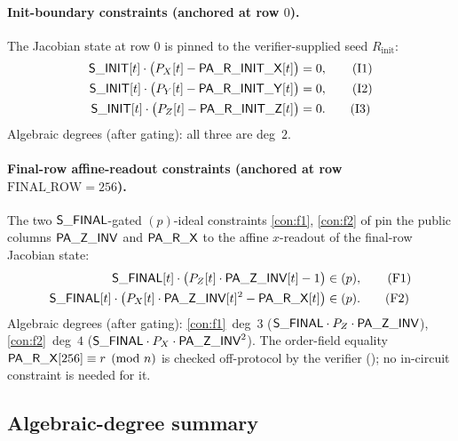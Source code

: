 \paragraph{Init-boundary constraints (anchored at row $0$).}

The Jacobian state at row $0$ is pinned to the verifier-supplied
seed $R_{\mathrm{init}}$:
\begin{align}
\mathsf{S\_INIT}[t] \cdot \bigl(P_X[t] - \mathsf{PA\_R\_INIT\_X}[t]\bigr) &= 0,\tag{I1}\label{con:init-x}\\
\mathsf{S\_INIT}[t] \cdot \bigl(P_Y[t] - \mathsf{PA\_R\_INIT\_Y}[t]\bigr) &= 0,\tag{I2}\label{con:init-y}\\
\mathsf{S\_INIT}[t] \cdot \bigl(P_Z[t] - \mathsf{PA\_R\_INIT\_Z}[t]\bigr) &= 0.\tag{I3}\label{con:init-z}
\end{align}
Algebraic degrees (after gating): all three are deg~$2$.

\paragraph{Final-row affine-readout constraints (anchored at row $\mathrm{FINAL\_ROW} = 256$).}

The two $\mathsf{S\_FINAL}$-gated $(p)$-ideal constraints
\ref{con:f1}, \ref{con:f2} of  pin the
public columns $\mathsf{PA\_Z\_INV}$ and $\mathsf{PA\_R\_X}$ to the affine
$x$-readout of the final-row Jacobian state:
\begin{align}
\mathsf{S\_FINAL}[t] \cdot \bigl(P_Z[t] \cdot \mathsf{PA\_Z\_INV}[t] - 1\bigr) &\in (p), \tag{F1}\\
\mathsf{S\_FINAL}[t] \cdot \bigl(P_X[t] \cdot \mathsf{PA\_Z\_INV}[t]^2 - \mathsf{PA\_R\_X}[t]\bigr) &\in (p). \tag{F2}
\end{align}
Algebraic degrees (after gating): \ref{con:f1}~deg~$3$
($\mathsf{S\_FINAL} \cdot P_Z \cdot \mathsf{PA\_Z\_INV}$),
\ref{con:f2}~deg~$4$ ($\mathsf{S\_FINAL} \cdot P_X \cdot \mathsf{PA\_Z\_INV}^2$).
The order-field equality $\mathsf{PA\_R\_X}[256] \equiv r \pmod n$ is
checked off-protocol by the verifier (); no
in-circuit constraint is needed for it.

\subsection{Algebraic-degree summary}\label{sec:degree}

